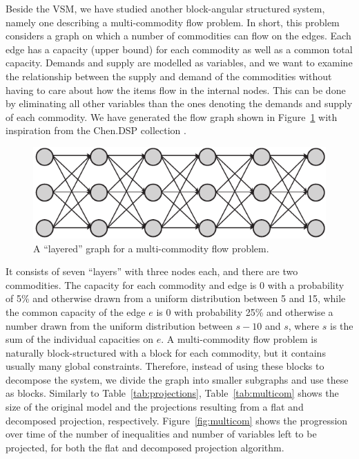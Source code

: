 \documentclass{llncs}
\begin{document}
Beside the VSM, we have studied another block-angular structured system, namely one describing a multi-commodity flow problem.  
In short, this problem considers a graph on which a number of commodities can flow on the edges. Each edge has a capacity (upper bound) for each commodity as well as a common total capacity. Demands and supply are modelled as variables, and we want to examine the relationship between the supply and demand of the commodities without having to care about how the items flow in the internal nodes. This can be done by eliminating all other variables than the ones denoting the demands and supply of each commodity. We have generated the flow graph shown in Figure~\ref{fig:multiflow} with inspiration from the Chen.DSP collection \cite{JLFP93}. 
\begin{figure}[tb]
	\centering
		\includegraphics[scale=0.5]{figures/multiflow2.pdf}
	\caption{A ``layered''  graph for a multi-commodity flow problem.}
	\label{fig:multiflow}
\end{figure}
It consists of seven ``layers'' with three nodes each, and there are two commodities. The capacity for each commodity and edge is 0 with a probability of 5\% and otherwise drawn from a uniform distribution between 5 and 15, while the common capacity of the edge $e$ is 0 with probability 25\% and otherwise a number drawn from the uniform distribution between $s-1$0 and $s$, where $s$ is the sum of the individual capacities on $e$. A multi-commodity flow problem is naturally block-structured with a block for each commodity, but it contains usually many global constraints. Therefore, instead of using these blocks to decompose the system, we divide the graph into smaller subgraphs and use these as blocks. 
Similarly to Table~\ref{tab:projections}, Table~\ref{tab:multicom} shows the size of the original model and the projections resulting from a flat and decomposed projection, respectively. Figure~\ref{fig:multicom} shows the progression over time of the number of inequalities and number of variables left to be projected, for both the flat and decomposed projection algorithm.
\end{document}
